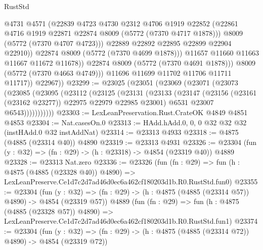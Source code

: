 \begin{lexlean}{RustStd}
\begin{coremodule}
                          @4731
                          @4571
                          (@22839
                            @4723
                            @4730
                            @2312
                            @4706
                            @1919
                            @22852
                            (@22861 @4716 @1919 @22871 @22874 @8009 (@5772 (@7370 @4717 @1878)))
                            @8009
                            (@5772 (@7370 @4707 @4723)))
                          @22889
                          @22892
                          @22895
                          @22899
                          @22904
                          @22910))
                      @22874
                      @8009
                      (@5772 (@7370 @4699 @1878)))
                    @11657
                    @11660
                    @11663
                    @11667
                    @11672
                    @11678))
                @22874
                @8009
                (@5772 (@7370 @4691 @1878)))
              @8009
              (@5772 (@7370 @4663 @4749)))
            @11696
            @11699
            @11702
            @11706
            @11711
            @11717))
        @22967))
@23299 := @23025
    (@23051
      (@23069
        (@23071
          (@23073
            (@23085
              (@23095
                (@23112
                  (@23125
                    (@23131
                      (@23133
                        (@23147
                          (@23156 (@23161 (@23162 @23277)) @22975 @22979 @22985 @23001)
                          @6531
                          @23007
                          @6543)))))))))))
@23303 := LexLeanPreservation.Rust.CrateOK @4849 @4851 @4853
@23304 := Nat.casesOn.{0}
@23313 := HAdd.hAdd.{0, 0, 0} @32 @32 @32 (instHAdd.{0} @32 instAddNat)
@23314 := @23313 @4933
@23318 := @4875 (@4885 (@23314 @40)) @4890
@23319 := @23313 @4931
@23326 := @23304 (fun (y : @32) => (fn : @29) -> (h : @23318) -> @4854 (@23319 @40)) @4889
@23328 := @23313 Nat.zero
@23336 := @23326
    (fun (fn : @29) =>
    fun (h : @4875 (@4885 (@23328 @40)) @4890) =>
    LexLeanPreserve.Ce1d7c2d7ad46d0ec6a462cf180203d1b.R0.RustStd.fun0)
@23355 := @23304
    (fun (y : @32) => (fn : @29) -> (h : @4875 (@4885 (@23314 @57)) @4890) -> @4854 (@23319 @57))
    @4889
    (fun (fn : @29) =>
    fun (h : @4875 (@4885 (@23328 @57)) @4890) =>
    LexLeanPreserve.Ce1d7c2d7ad46d0ec6a462cf180203d1b.R0.RustStd.fun1)
@23374 := @23304
    (fun (y : @32) => (fn : @29) -> (h : @4875 (@4885 (@23314 @72)) @4890) -> @4854 (@23319 @72))

\end{coremodule}
\end{lexlean}
